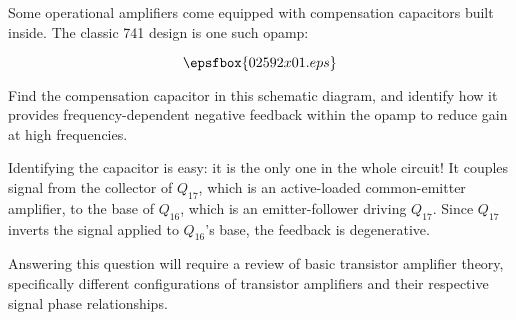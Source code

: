 

Some operational amplifiers come equipped with compensation capacitors built inside.  The classic 741 design is one such opamp:

$$\epsfbox{02592x01.eps}$$

Find the compensation capacitor in this schematic diagram, and identify how it provides frequency-dependent negative feedback within the opamp to reduce gain at high frequencies.







Identifying the capacitor is easy: it is the only one in the whole circuit!  It couples signal from the collector of $Q_{17}$, which is an active-loaded common-emitter amplifier, to the base of $Q_{16}$, which is an emitter-follower driving $Q_{17}$.  Since $Q_{17}$ inverts the signal applied to $Q_{16}$'s base, the feedback is degenerative.







Answering this question will require a review of basic transistor amplifier theory, specifically different configurations of transistor amplifiers and their respective signal phase relationships.




